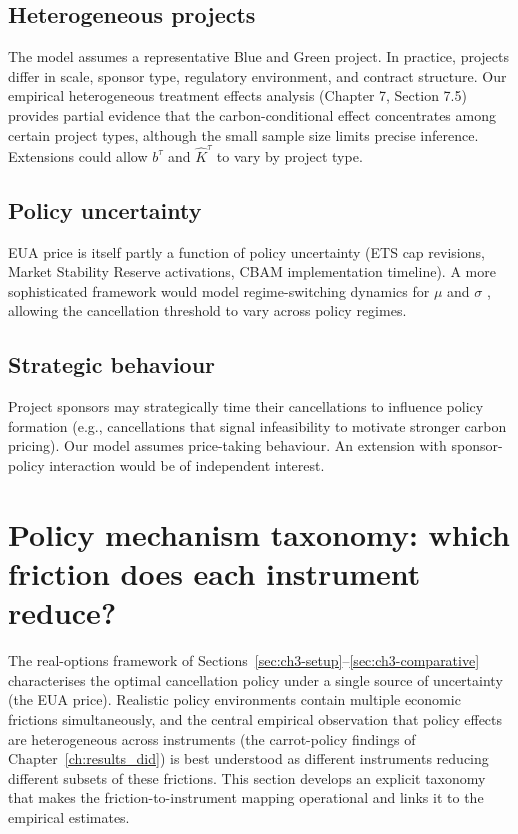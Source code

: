 \subsection{Heterogeneous projects}

The model assumes a representative Blue and Green project. In practice, projects differ in scale, sponsor type, regulatory environment, and contract structure. Our empirical heterogeneous treatment effects analysis (Chapter 7, Section 7.5) provides partial evidence that the carbon-conditional effect concentrates among certain project types, although the small sample size limits precise inference. Extensions could allow $b^{\tau}$ and $\hat{K}^{\tau}$ to vary by project type.

\subsection{Policy uncertainty}

EUA price is itself partly a function of policy uncertainty (ETS cap revisions, Market Stability Reserve activations, CBAM implementation timeline). A more sophisticated framework would model regime-switching dynamics for $\mu$ and $\sigma$ \cite{creal2013generalized}, allowing the cancellation threshold to vary across policy regimes.

\subsection{Strategic behaviour}

Project sponsors may strategically time their cancellations to influence policy formation (e.g., cancellations that signal infeasibility to motivate stronger carbon pricing). Our model assumes price-taking behaviour. An extension with sponsor-policy interaction would be of independent interest.

\section{Policy mechanism taxonomy: which friction does each instrument reduce?}
\label{sec:ch3-mechanism-taxonomy}

The real-options framework of Sections~\ref{sec:ch3-setup}--\ref{sec:ch3-comparative} characterises the optimal cancellation policy under a single source of uncertainty (the EUA price). Realistic policy environments contain multiple economic frictions simultaneously, and the central empirical observation that policy effects are heterogeneous across instruments (the carrot-policy findings of Chapter~\ref{ch:results_did}) is best understood as different instruments reducing different subsets of these frictions. This section develops an explicit taxonomy that makes the friction-to-instrument mapping operational and links it to the empirical estimates.

